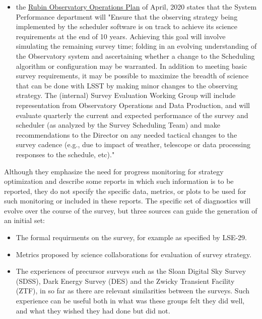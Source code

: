 \begin{itemize}
\item the \href{https://docushare.lsst.org/docushare/dsweb/Get/Document-36797/Rubin\%20Observatory\%20Operations\%20Plan\%20April\%202020.pdf}{Rubin Observatory Operations Plan} of April, 2020 states that the System Performance department will "Ensure that the observing strategy being implemented by the scheduler software is on track to achieve its science requirements at the end of 10 years. Achieving this goal will involve simulating the remaining survey time; folding in an evolving understanding of the Observatory system and ascertaining whether a change to the Scheduling algorithm or configuration may be warranted. In addition to meeting basic survey requirements, it may be possible to maximize the breadth of science that can be done with LSST by making minor changes to the observing strategy. The (internal) Survey Evaluation Working Group will include representation from Observatory Operations and Data Production, and will evaluate quarterly the current and expected performance of the survey and scheduler (as analyzed by the Survey Scheduling Team) and make recommendations to the Director on any needed tactical changes to the survey cadence (e.g., due to impact of weather, telescope or data processing responses to the schedule, etc)."
\end{itemize}

Although they emphasize the need for progress monitoring for strategy optimization and describe some reports in which such information is to be reported, they do not specify the specific data, metrics, or plots to be used for such monitoring or included in these reports.
The specific set of diagnostics will evolve over the course of the survey, but three sources can guide the generation of an initial set:
\begin{itemize}
\item The formal requirments on the survey, for example as specified by LSE-29.
\item Metrics proposed by science collaborations for evaluation of survey strategy.
\item The experiences of precursor surveys such as the Sloan Digital Sky Survey (SDSS), Dark Energy Survey (DES) and the Zwicky Transient Facility (ZTF), in so far as there are relevant similarities between the surveys. Such experience can be useful both in what was these groups felt they did well, and what they wished they had done but did not.
\end{itemize}

